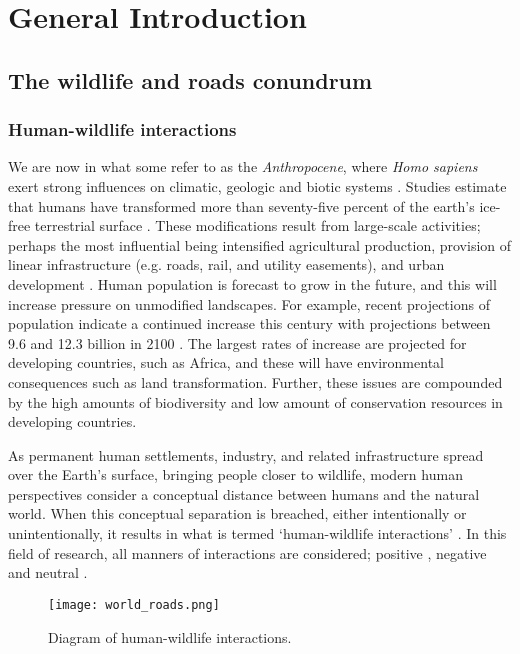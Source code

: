 \chapter{General Introduction}\label{sec:intro}
\newpage

\section{The wildlife and roads conundrum}

\subsection{Human-wildlife interactions}

We are now in what some refer to as the \textit{Anthropocene}, where \textit{Homo sapiens} exert strong influences on climatic, geologic and biotic systems \citep{crut06}. Studies estimate that humans have transformed more than seventy-five percent of the earth's ice-free terrestrial surface \citep[e.g.][]{elli08}. These modifications result from large-scale activities; perhaps the most influential being intensified agricultural production, provision of linear infrastructure (e.g. roads, rail, and utility easements), and urban development \citep{vito97,sand02,fole05}. Human population is forecast to grow in the future, and this will increase pressure on unmodified landscapes. For example, recent projections of population indicate a continued increase this century with projections between 9.6 and 12.3 billion in 2100 \citep{gerl14}. The largest rates of increase are projected for developing countries, such as Africa, and these will have environmental consequences such as land transformation. Further, these issues are compounded by the high amounts of biodiversity and low amount of  conservation resources in developing countries. 

As permanent human settlements, industry, and related infrastructure spread over the Earth’s surface, bringing people closer to wildlife, modern human perspectives consider a conceptual distance between humans and the natural world. When this conceptual separation is breached, either intentionally or unintentionally, it results in what is termed `human-wildlife interactions' \citep[see][]{manf08}. In this field of research, all manners of interactions are considered; positive \citep{dall12}, negative \citep{jone99} and neutral .

\begin{figure*}[!t]
  \centering
  \texttt{[image: world\_roads.png]}
  \caption[Diagram of human-wildlife interactions]{Diagram of human-wildlife interactions.}
  \label{hmi_diagram}
\end{figure*}

